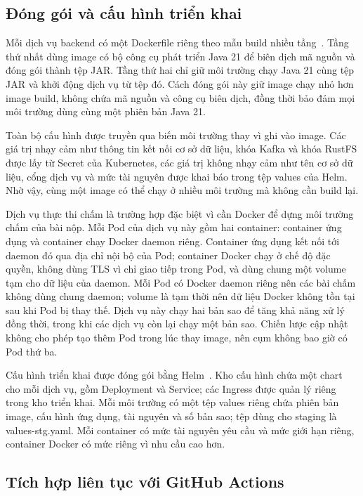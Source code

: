 \documentclass[../BTL.tex]{subfiles}
\begin{document}
\subsection{Đóng gói và cấu hình triển khai}
\label{section:3.1.2}

Mỗi dịch vụ backend có một Dockerfile riêng theo mẫu build nhiều tầng~\cite{dockerdocs}. Tầng thứ nhất dùng image có bộ công cụ phát triển Java 21 để biên dịch mã nguồn và đóng gói thành tệp JAR. Tầng thứ hai chỉ giữ môi trường chạy Java 21 cùng tệp JAR và khởi động dịch vụ từ tệp đó. Cách đóng gói này giữ image chạy nhỏ hơn image build, không chứa mã nguồn và công cụ biên dịch, đồng thời bảo đảm mọi môi trường dùng cùng một phiên bản Java 21.

Toàn bộ cấu hình được truyền qua biến môi trường thay vì ghi vào image. Các giá trị nhạy cảm như thông tin kết nối cơ sở dữ liệu, khóa Kafka và khóa RustFS được lấy từ Secret của Kubernetes, các giá trị không nhạy cảm như tên cơ sở dữ liệu, cổng dịch vụ và mức tài nguyên được khai báo trong tệp values của Helm. Nhờ vậy, cùng một image có thể chạy ở nhiều môi trường mà không cần build lại.

Dịch vụ thực thi chấm là trường hợp đặc biệt vì cần Docker để dựng môi trường chấm của bài nộp. Mỗi Pod của dịch vụ này gồm hai container: container ứng dụng và container chạy Docker daemon riêng. Container ứng dụng kết nối tới daemon đó qua địa chỉ nội bộ của Pod; container Docker chạy ở chế độ đặc quyền, không dùng TLS vì chỉ giao tiếp trong Pod, và dùng chung một volume tạm cho dữ liệu của daemon. Mỗi Pod có Docker daemon riêng nên các bài chấm không dùng chung daemon; volume là tạm thời nên dữ liệu Docker không tồn tại sau khi Pod bị thay thế. Dịch vụ này chạy hai bản sao để tăng khả năng xử lý đồng thời, trong khi các dịch vụ còn lại chạy một bản sao. Chiến lược cập nhật không cho phép tạo thêm Pod trong lúc thay image, nên cụm không bao giờ có Pod thứ ba.

Cấu hình triển khai được đóng gói bằng Helm~\cite{helmdocs}. Kho cấu hình chứa một chart cho mỗi dịch vụ, gồm Deployment và Service; các Ingress được quản lý riêng trong kho triển khai. Mỗi môi trường có một tệp values riêng chứa phiên bản image, cấu hình ứng dụng, tài nguyên và số bản sao; tệp dùng cho staging là values-stg.yaml. Mỗi container có mức tài nguyên yêu cầu và mức giới hạn riêng, container Docker có mức riêng vì nhu cầu cao hơn.

\subsection{Tích hợp liên tục với GitHub Actions}
\label{section:3.1.3}
\end{document}
